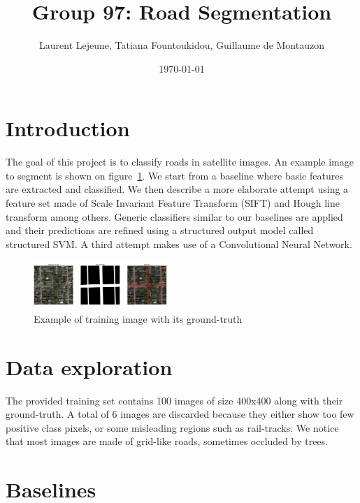 \documentclass[10pt,conference,compsocconf]{IEEEtran}
\author{Laurent Lejeune, Tatiana Fountoukidou, Guillaume de Montauzon}
\date{\today}
\title{Group 97: Road Segmentation}
\begin{document}
	
\maketitle
	
\section{Introduction}
  The goal of this project is to classify roads in satellite images. An example
  image to segment is shown on figure~\ref{fig:example}.
  We start from a baseline where basic features are extracted and classified. We then describe a more elaborate attempt using a feature set made of Scale Invariant Feature Transform (SIFT) and Hough line transform among others. Generic classifiers similar to our baselines are applied and their predictions are refined using a structured output model called
  structured SVM. A third attempt makes use of a Convolutional Neural Network.
	\begin{figure}[h]
		\centering
		\includegraphics[width=0.45\textwidth]{example.png}
		\caption{Example of training image with its ground-truth}
		\label{fig:example}
	\end{figure}
	
\section{Data exploration}
	The provided training set contains 100 images of size 400x400 along with their
  ground-truth. A total of 6 images are discarded because they either show too few positive class pixels, or some misleading regions such as rail-tracks. 
	We notice that most images are made of grid-like roads, sometimes occluded by trees. 

\section{Baselines}
\end{document}
